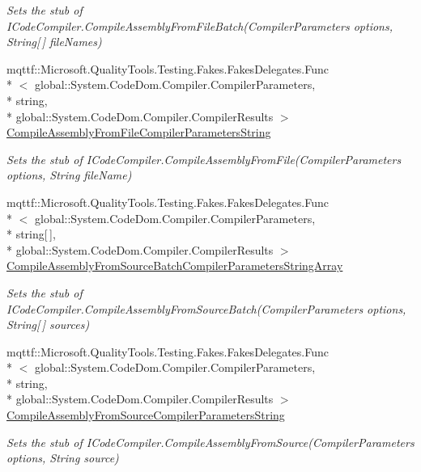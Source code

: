 \begin{DoxyCompactItemize}
\begin{DoxyCompactList}\small\item\em Sets the stub of I\-Code\-Compiler.\-Compile\-Assembly\-From\-File\-Batch(\-Compiler\-Parameters options, String\mbox{[}$\,$\mbox{]} file\-Names)\end{DoxyCompactList}\item 
mqttf\-::\-Microsoft.\-Quality\-Tools.\-Testing.\-Fakes.\-Fakes\-Delegates.\-Func\\*
$<$ global\-::\-System.\-Code\-Dom.\-Compiler.\-Compiler\-Parameters, \\*
string, \\*
global\-::\-System.\-Code\-Dom.\-Compiler.\-Compiler\-Results $>$ \hyperlink{class_system_1_1_code_dom_1_1_compiler_1_1_fakes_1_1_stub_i_code_compiler_aa37f09f50760f92c868afc123efbff27}{Compile\-Assembly\-From\-File\-Compiler\-Parameters\-String}
\begin{DoxyCompactList}\small\item\em Sets the stub of I\-Code\-Compiler.\-Compile\-Assembly\-From\-File(\-Compiler\-Parameters options, String file\-Name)\end{DoxyCompactList}\item 
mqttf\-::\-Microsoft.\-Quality\-Tools.\-Testing.\-Fakes.\-Fakes\-Delegates.\-Func\\*
$<$ global\-::\-System.\-Code\-Dom.\-Compiler.\-Compiler\-Parameters, \\*
string\mbox{[}$\,$\mbox{]}, \\*
global\-::\-System.\-Code\-Dom.\-Compiler.\-Compiler\-Results $>$ \hyperlink{class_system_1_1_code_dom_1_1_compiler_1_1_fakes_1_1_stub_i_code_compiler_a174bf06328589d855722e5bf84baa20c}{Compile\-Assembly\-From\-Source\-Batch\-Compiler\-Parameters\-String\-Array}
\begin{DoxyCompactList}\small\item\em Sets the stub of I\-Code\-Compiler.\-Compile\-Assembly\-From\-Source\-Batch(\-Compiler\-Parameters options, String\mbox{[}$\,$\mbox{]} sources)\end{DoxyCompactList}\item 
mqttf\-::\-Microsoft.\-Quality\-Tools.\-Testing.\-Fakes.\-Fakes\-Delegates.\-Func\\*
$<$ global\-::\-System.\-Code\-Dom.\-Compiler.\-Compiler\-Parameters, \\*
string, \\*
global\-::\-System.\-Code\-Dom.\-Compiler.\-Compiler\-Results $>$ \hyperlink{class_system_1_1_code_dom_1_1_compiler_1_1_fakes_1_1_stub_i_code_compiler_a8352ee9a3cfd19014b0433f42b92d130}{Compile\-Assembly\-From\-Source\-Compiler\-Parameters\-String}
\begin{DoxyCompactList}\small\item\em Sets the stub of I\-Code\-Compiler.\-Compile\-Assembly\-From\-Source(\-Compiler\-Parameters options, String source)\end{DoxyCompactList}\end{DoxyCompactItemize}


